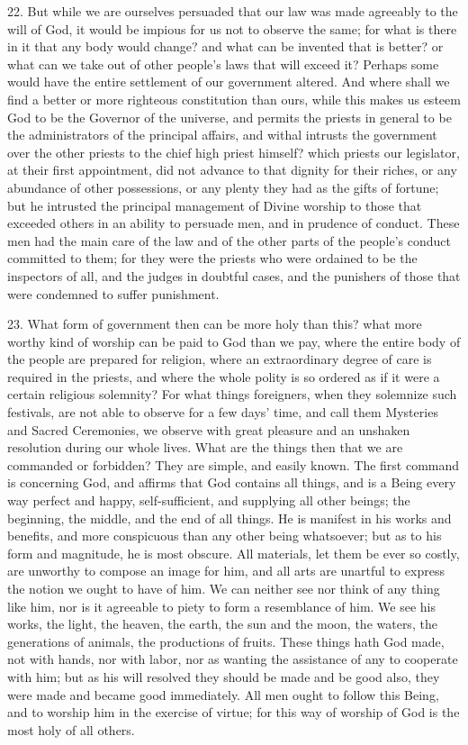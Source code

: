 22. But while we are ourselves persuaded that our law was made agreeably
to the will of God, it would be impious for us not to observe the same;
for what is there in it that any body would change? and what can be
invented that is better? or what can we take out of other people's laws
that will exceed it? Perhaps some would have the entire settlement of our
government altered. And where shall we find a better or more righteous
constitution than ours, while this makes us esteem God to be the Governor
of the universe, and permits the priests in general to be the
administrators of the principal affairs, and withal intrusts the
government over the other priests to the chief high priest himself? which
priests our legislator, at their first appointment, did not advance to
that dignity for their riches, or any abundance of other possessions, or
any plenty they had as the gifts of fortune; but he intrusted the
principal management of Divine worship to those that exceeded others in an
ability to persuade men, and in prudence of conduct. These men had the
main care of the law and of the other parts of the people's conduct
committed to them; for they were the priests who were ordained to be the
inspectors of all, and the judges in doubtful cases, and the punishers of
those that were condemned to suffer punishment.

23. What form of government then can be more holy than this? what more
worthy kind of worship can be paid to God than we pay, where the entire
body of the people are prepared for religion, where an extraordinary
degree of care is required in the priests, and where the whole polity is
so ordered as if it were a certain religious solemnity? For what things
foreigners, when they solemnize such festivals, are not able to observe
for a few days' time, and call them Mysteries and Sacred Ceremonies, we
observe with great pleasure and an unshaken resolution during our whole
lives. What are the things then that we are commanded or forbidden? They
are simple, and easily known. The first command is concerning God, and
affirms that God contains all things, and is a Being every way perfect and
happy, self-sufficient, and supplying all other beings; the beginning, the
middle, and the end of all things. He is manifest in his works and
benefits, and more conspicuous than any other being whatsoever; but as to
his form and magnitude, he is most obscure. All materials, let them be
ever so costly, are unworthy to compose an image for him, and all arts are
unartful to express the notion we ought to have of him. We can neither see
nor think of any thing like him, nor is it agreeable to piety to form a
resemblance of him. We see his works, the light, the heaven, the earth,
the sun and the moon, the waters, the generations of animals, the
productions of fruits. These things hath God made, not with hands, nor
with labor, nor as wanting the assistance of any to cooperate with him;
but as his will resolved they should be made and be good also, they were
made and became good immediately. All men ought to follow this Being, and
to worship him in the exercise of virtue; for this way of worship of God
is the most holy of all others.

